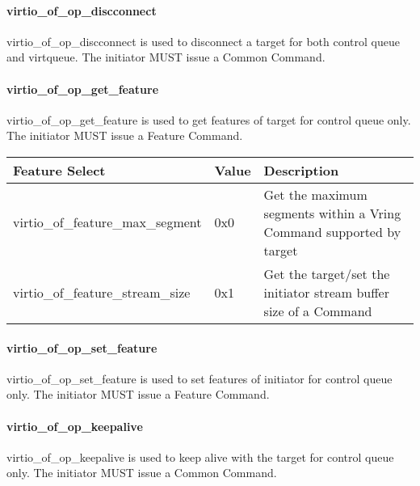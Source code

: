\paragraph{virtio_of_op_discconnect}\label{sec:Virtio Transport Options / Virtio Over Fabrics / Transmition Protocol / Opcodes Definition / virtio_of_op_discconnect}

virtio_of_op_discconnect is used to disconnect a target for both control queue and virtqueue. The initiator MUST issue a Common Command.

\paragraph{virtio_of_op_get_feature}\label{sec:Virtio Transport Options / Virtio Over Fabrics / Transmition Protocol / Opcodes Definition / virtio_of_op_get_feature}

virtio_of_op_get_feature is used to get features of target for control queue only. The initiator MUST issue a Feature Command.

\begin{tabular}{ |l|l|l| }
\hline
Feature Select & Value & Description \\
\hline
virtio_of_feature_max_segment & 0x0 & Get the maximum segments within a Vring Command supported by target \\
\hline
virtio_of_feature_stream_size & 0x1 & Get the target/set the initiator stream buffer size of a Command \\
\hline
\end{tabular}

\paragraph{virtio_of_op_set_feature}\label{sec:Virtio Transport Options / Virtio Over Fabrics / Transmition Protocol / Opcodes Definition / virtio_of_op_set_feature}

virtio_of_op_set_feature is used to set features of initiator for control queue only. The initiator MUST issue a Feature Command.

\paragraph{virtio_of_op_keepalive}\label{sec:Virtio Transport Options / Virtio Over Fabrics / Transmition Protocol / Opcodes Definition / virtio_of_op_keepalive}

virtio_of_op_keepalive is used to keep alive with the target for control queue only. The initiator MUST issue a Common Command.

